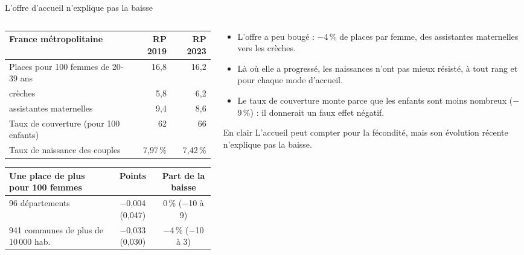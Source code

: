 \documentclass[10pt,aspectratio=169]{beamer}
\begin{document}
\begin{frame}{L'offre d'accueil n'explique pas la baisse}
  \begin{columns}[T]
    \begin{column}{0.50\textwidth}
      \scriptsize\setlength{\tabcolsep}{3pt}
      \begin{tabular}{@{}lrr@{}}
        \toprule
        France métropolitaine & RP 2019 & RP 2023 \\
        \midrule
        Places pour 100 femmes de 20-39 ans & 16,8 & 16,2 \\
        \quad crèches & 5,8 & 6,2 \\
        \quad assistantes maternelles & 9,4 & 8,6 \\
        Taux de couverture (pour 100 enfants) & 62 & 66 \\
        Taux de naissance des couples & 7,97\,\% & 7,42\,\% \\
        \bottomrule
      \end{tabular}
      \vspace{0.3cm}

      \begin{tabular}{@{}lcc@{}}
        \toprule
        Une place de plus pour 100 femmes & Points & Part de la baisse \\
        \midrule
        96 départements & $-$0,004 (0,047) & 0\,\% ($-$10 à 9) \\
        941 communes de plus de 10\,000 hab. & $-$0,033 (0,030) & $-$4\,\% ($-$10 à 3) \\
        \bottomrule
      \end{tabular}
    \end{column}
    \begin{column}{0.46\textwidth}
      \small
      \begin{itemize}\setlength{\itemsep}{0.35em}
        \item L'offre a peu bougé : $-$4\,\% de places par femme, des assistantes maternelles vers les crèches.
        \item Là où elle a progressé, les naissances n'ont pas mieux résisté, à tout rang et pour chaque mode d'accueil.
        \item Le taux de couverture monte parce que les enfants sont moins nombreux ($-$9\,\%) : il donnerait un faux effet négatif.
      \end{itemize}
      \begin{callout}[tdtenavy]{En clair}
        \footnotesize\RaggedRight L'accueil peut compter pour la fécondité, mais son évolution récente n'explique pas la baisse.
      \end{callout}
    \end{column}
  \end{columns}
\end{frame}
\end{document}
